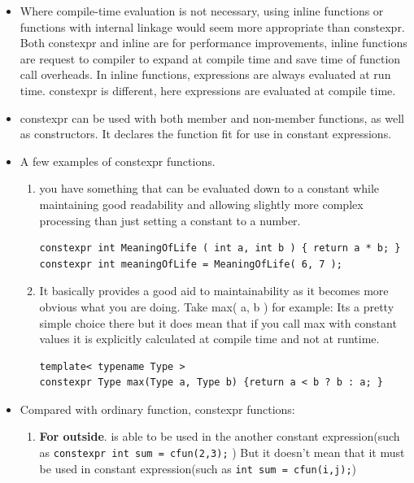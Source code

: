 \documentclass[a4paper,11pt,twoside]{book}
\begin{document}
\begin{itemize}
	\item Where compile-time evaluation is not necessary, using inline functions or functions with internal linkage would seem more appropriate than constexpr. Both constexpr and inline are for performance improvements, inline functions are request to compiler to expand at compile time and save time of function call overheads. In inline functions, expressions are always evaluated at run time. constexpr is different, here expressions are evaluated at compile time.
	
	\item constexpr can be used with both member and non-member functions, as well as constructors. It declares the function fit for use in constant expressions. 
	
	\item A few examples of constexpr functions. 
	\begin{enumerate}
		\item you have something that can be evaluated down to a constant while maintaining good readability and allowing slightly more complex processing than just setting a constant to a number.
\begin{lstlisting}[numbers=none]
constexpr int MeaningOfLife ( int a, int b ) { return a * b; }
constexpr int meaningOfLife = MeaningOfLife( 6, 7 );
\end{lstlisting}
		
		\item It basically provides a good aid to maintainability as it becomes more obvious what you are doing. Take max( a, b ) for example: Its a pretty simple choice there but it does mean that if you call max with constant values it is explicitly calculated at compile time and not at runtime.
\begin{lstlisting}[numbers=none]
template< typename Type > 
constexpr Type max(Type a, Type b) {return a < b ? b : a; }
\end{lstlisting}
		
	\end{enumerate}
	
	\item Compared with ordinary function, constexpr functions:
	\begin{enumerate}
		\item \textbf{For outside}. is able to be used in the another constant expression(such as \texttt{constexpr int sum = cfun(2,3);} ) But it doesn't mean that it must be used in constant expression(such as \texttt{int sum = cfun(i,j);})
		


\end{enumerate}
\end{itemize}
\end{document}
